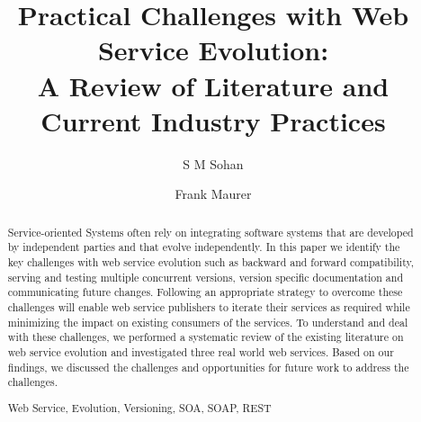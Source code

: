 \documentclass[runningheads,a4paper]{llncs}
\newcommand{\keywords}[1]{\par\addvspace\baselineskip
\noindent\keywordname\enspace\ignorespaces#1}
\begin{document}
\mainmatter  %

\title{Practical Challenges with Web Service Evolution:\\A Review of Literature and Current Industry Practices}


%
%
\author{S M Sohan%
\and Frank Maurer}
%


%
%

\maketitle


\begin{abstract}


Service-oriented Systems often rely on integrating software systems that are developed by independent parties and that evolve independently. In this paper we identify the key challenges with web service evolution such as backward and forward compatibility, serving and testing multiple concurrent versions, version specific documentation and communicating future changes. Following an appropriate strategy to overcome these challenges will enable web service publishers to iterate their services as required while minimizing the impact on existing consumers of the services. To understand and deal with these challenges, we performed a systematic review of the existing literature on web service evolution and investigated three real world web services. Based on our findings, we discussed the challenges and opportunities for future work to address the challenges.

\keywords{Web Service, Evolution, Versioning, SOA, SOAP, REST}
\end{abstract}
\end{document}

